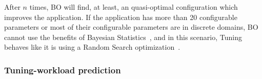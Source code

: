After $n$ times, BO will find, at least, an quasi-optimal configuration which
improves the application. If the application has more than 20 configurable
parameters or most of their configurable parameters are in discrete domains, BO
cannot use the benefits of Bayesian Statistics~\cite{?}, and in this scenario,
Tuning behaves like it is using a Random Search optimization~\cite{?}.

\subsubsection{Tuning-workload prediction}

